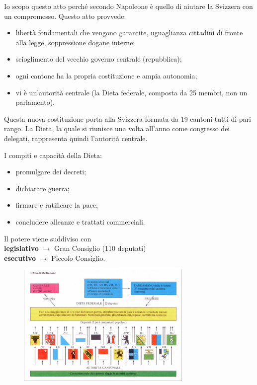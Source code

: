 \documentclass[a4paper]{article}
\begin{document}

Io scopo questo atto perché secondo Napoleone è quello di aiutare la Svizzera con un compromesso.
Questo atto provvede:
\begin{itemize}
    \item libertà fondamentali che vengono garantite, uguaglianza cittadini di fronte alla legge, soppressione dogane interne;
    \item scioglimento del vecchio governo centrale (repubblica);
    \item ogni cantone ha la propria costituzione e ampia autonomia;
    \item vi è un'autorità centrale (la Dieta federale, composta da 25 membri, non un parlamento).
\end{itemize}

Questa nuova costituzione porta alla Svizzera formata da 19 cantoni tutti di pari rango.
La Dieta, la quale si riunisce una volta all'anno come congresso dei delegati,
rappresenta quindi l'autorità centrale.

I compiti e capacità della Dieta:
\begin{itemize}
    \item promulgare dei decreti;
    \item dichiarare guerra;
    \item firmare e ratificare la pace;
    \item concludere alleanze e trattati commerciali.
\end{itemize}

Il potere viene suddiviso con \\
\textbf{legislativo} \(\rightarrow\) Gran Consiglio (110 deputati) \\
\textbf{esecutivo} \(\rightarrow\) Piccolo Consiglio.

\begin{figure}[h]
    \centering
    \includegraphics[width=0.75\textwidth]{./mediazione.png}
\end{figure}
\end{document}
